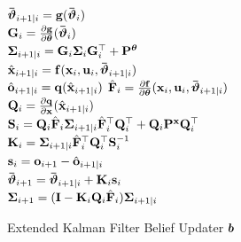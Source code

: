 \begin{figure}
\vspace{-20pt}
\begin{algorithm}[H]
{\small
\SetAlgoLined
\DontPrintSemicolon
\caption{Extended Kalman Filter Belief Updater $\boldsymbol{b}$}
\label{alg:ekf}
{
    \BlankLine
    $\boldsymbol{\bar{\boldsymbol{{\vartheta}}}}_{i+1|i} = \mathbf{g}(\boldsymbol{\bar{\boldsymbol{{\vartheta}}}}_{i})$\\
    $\mathbf{G}_i = \frac{\partial \mathbf{g}}{\partial \boldsymbol{\theta}}(\boldsymbol{\bar{\boldsymbol{{\vartheta}}}}_i)$\\
    $\boldsymbol{\boldsymbol{\Sigma}}_{i+1|i} = \mathbf{G}_i \boldsymbol{\boldsymbol{\Sigma}}_i \mathbf{G}_i^\top + \mathbf{P}^{\boldsymbol{\theta}}$\\
    $\hat{\mathbf{x}}_{i+1|i} = \mathbf{f}(\mathbf{x}_{i}, \mathbf{u}_i, \boldsymbol{\bar{\boldsymbol{{\vartheta}}}}_{i+1|i})$\\
    $\hat{\mathbf{o}}_{i+1|i} = \mathbf{q}(\hat{\mathbf{x}}_{i+1|i})$
    \BlankLine
    $\hat{\mathbf{F}}_{i} = \frac{\partial \mathbf{f}}{\partial \boldsymbol{\theta}}(\mathbf{x}_{i}, \mathbf{u}_{i}, \boldsymbol{\bar{\boldsymbol{{\vartheta}}}}_{i+1|i})$\\
    $\mathbf{Q}_{i} = \frac{\partial \mathbf{q}}{\partial \mathbf{x}}(\hat{\mathbf{x}}_{i+1|i})$\\
    $\mathbf{S}_i = \mathbf{Q}_{i} \hat{\mathbf{F}}_i \boldsymbol{\boldsymbol{\Sigma}}_{i+1|i} \hat{\mathbf{F}}_i^\top \mathbf{Q}_{i}^\top + \mathbf{Q}_{i} \mathbf{P}^{\mathbf{x}} \mathbf{Q}_{i}^\top$\\
    $\mathbf{K}_i = \boldsymbol{\boldsymbol{\Sigma}}_{i+1|i}\hat{\mathbf{F}}_i^\top \mathbf{Q}_{i}^\top \mathbf{S}_i^{-1}$
    \\$\mathbf{s}_{i} = \mathbf{o}_{i+1} - \hat{\mathbf{o}}_{i+1|i}$\\
    $\boldsymbol{\bar{\boldsymbol{{\vartheta}}}}_{i+1} = \boldsymbol{\bar{\boldsymbol{{\vartheta}}}}_{i+1|i} + \mathbf{K}_i\mathbf{s}_{i}$\\
    $\boldsymbol{\boldsymbol{\Sigma}}_{i+1} = (\mathbf{I} - \mathbf{K}_i \mathbf{Q}_{i} \hat{\mathbf{F}}_i)\boldsymbol{\boldsymbol{\Sigma}}_{i+1|i}$
    \BlankLine
}
}
\end{algorithm}
\vspace{-20pt}
\end{figure}

